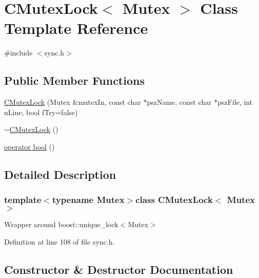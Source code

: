 \hypertarget{class_c_mutex_lock}{}\section{C\+Mutex\+Lock$<$ Mutex $>$ Class Template Reference}
\label{class_c_mutex_lock}


{\ttfamily \#include $<$sync.\+h$>$}

\subsection*{Public Member Functions}
\begin{DoxyCompactItemize}
\item 
\hyperlink{class_c_mutex_lock_ad08e2df1cad4c5732dafb1552abe6106}{C\+Mutex\+Lock} (Mutex \&mutex\+In, const char $\ast$psz\+Name, const char $\ast$psz\+File, int n\+Line, bool f\+Try=false)
\item 
\hyperlink{class_c_mutex_lock_af213c60c9abee229f5dc841670021c5a}{$\sim$\+C\+Mutex\+Lock} ()
\item 
\hyperlink{class_c_mutex_lock_a4358803c87a873252abebdd1b625d293}{operator bool} ()
\end{DoxyCompactItemize}


\subsection{Detailed Description}
\subsubsection*{template$<$typename Mutex$>$class C\+Mutex\+Lock$<$ Mutex $>$}

Wrapper around boost\+::unique\+\_\+lock$<$\+Mutex$>$ 

Definition at line 108 of file sync.\+h.



\subsection{Constructor \& Destructor Documentation}
\hypertarget{class_c_mutex_lock_ad08e2df1cad4c5732dafb1552abe6106}{}
